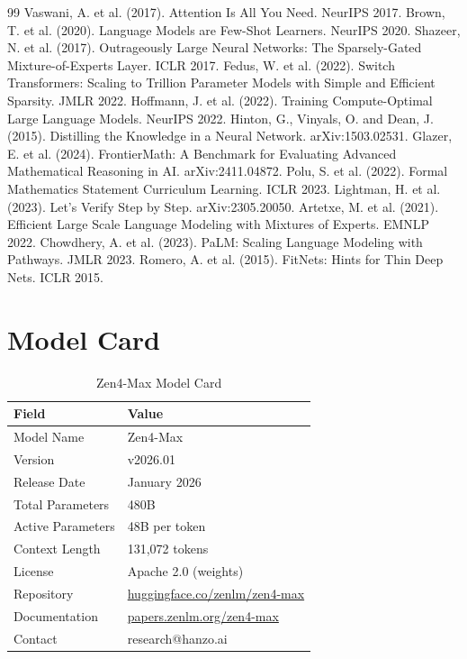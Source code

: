 \documentclass[11pt,a4paper]{article}
\begin{document}
\begin{thebibliography}{99}
 Vaswani, A. et al. (2017). Attention Is All You Need. NeurIPS 2017.
 Brown, T. et al. (2020). Language Models are Few-Shot Learners. NeurIPS 2020.
 Shazeer, N. et al. (2017). Outrageously Large Neural Networks: The Sparsely-Gated Mixture-of-Experts Layer. ICLR 2017.
 Fedus, W. et al. (2022). Switch Transformers: Scaling to Trillion Parameter Models with Simple and Efficient Sparsity. JMLR 2022.
 Hoffmann, J. et al. (2022). Training Compute-Optimal Large Language Models. NeurIPS 2022.
 Hinton, G., Vinyals, O. and Dean, J. (2015). Distilling the Knowledge in a Neural Network. arXiv:1503.02531.
 Glazer, E. et al. (2024). FrontierMath: A Benchmark for Evaluating Advanced Mathematical Reasoning in AI. arXiv:2411.04872.
 Polu, S. et al. (2022). Formal Mathematics Statement Curriculum Learning. ICLR 2023.
 Lightman, H. et al. (2023). Let's Verify Step by Step. arXiv:2305.20050.
 Artetxe, M. et al. (2021). Efficient Large Scale Language Modeling with Mixtures of Experts. EMNLP 2022.
 Chowdhery, A. et al. (2023). PaLM: Scaling Language Modeling with Pathways. JMLR 2023.
 Romero, A. et al. (2015). FitNets: Hints for Thin Deep Nets. ICLR 2015.
\end{thebibliography}

\appendix

\section{Model Card}

\begin{table}[H]
\centering
\begin{tabular}{ll}
\toprule
\textbf{Field} & \textbf{Value} \\
\midrule
Model Name       & Zen4-Max \\
Version          & v2026.01 \\
Release Date     & January 2026 \\
Total Parameters & 480B \\
Active Parameters& 48B per token \\
Context Length   & 131,072 tokens \\
License          & Apache 2.0 (weights) \\
Repository       & \href{https://huggingface.co/zenlm/zen4-max}{huggingface.co/zenlm/zen4-max} \\
Documentation    & \href{https://papers.zenlm.org/zen4-max}{papers.zenlm.org/zen4-max} \\
Contact          & research@hanzo.ai \\
\bottomrule
\end{tabular}
\caption{Zen4-Max Model Card}
\end{table}
\end{document}
